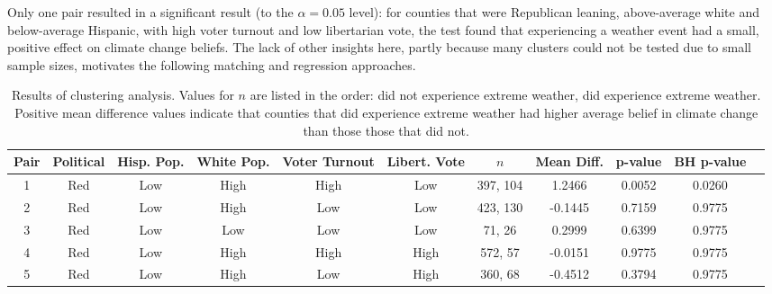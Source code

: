 \documentclass{article}
\begin{document}
Only one pair resulted in a significant result (to the $\alpha = 0.05$ level): for counties that were Republican leaning, above-average white and below-average Hispanic, with high voter turnout and low libertarian vote, the test found that experiencing a weather event had a small, positive effect on climate change beliefs. The lack of other insights here, partly because many clusters could not be tested due to small sample sizes, motivates the following matching and regression approaches.

\begin{center}
\begin{table}
\begin{tabular}{| c | c | c | c | c | c | c | c | c | c | c ||}
\hline
Pair & Political & Hisp. Pop. & White Pop. & Voter Turnout & Libert. Vote & $n$ & Mean Diff. & p-value & BH p-value \\ [0.5ex]
\hline
\hline
1 & Red & Low & High & High & Low & 397, 104 & 1.2466 & 0.0052 & 0.0260 \\
\hline
2 & Red & Low & High & Low & Low & 423, 130 & -0.1445 & 0.7159 & 0.9775 \\
\hline
3 & Red & Low & Low & Low & Low & 71, 26 & 0.2999 & 0.6399 & 0.9775 \\
\hline
4 & Red & Low & High & High & High & 572, 57 & -0.0151 & 0.9775 & 0.9775 \\
\hline
5 & Red & Low & High & Low & High & 360, 68 & -0.4512 & 0.3794 & 0.9775 \\
\hline
\end{tabular}
\caption{Results of clustering analysis. Values for $n$ are listed in the order: did not experience extreme weather, did experience extreme weather. Positive mean difference values indicate that counties that did experience extreme weather had higher average belief in climate change than those those that did not.}
\end{table}
\end{center}
\end{document}

